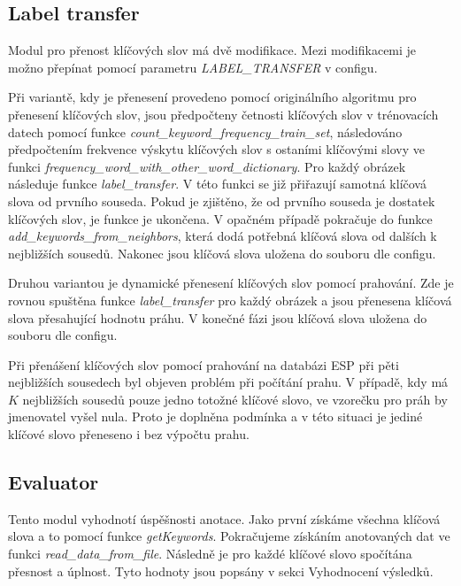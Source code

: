 \documentclass[czech,BP]{thesiskiv}
\begin{document}
\subsection{Label transfer}
\par Modul pro přenost klíčových slov má dvě modifikace. Mezi modifikacemi je možno přepínat pomocí parametru \textit{LABEL\_TRANSFER} v configu. 

\par Při variantě, kdy je přenesení provedeno pomocí originálního algoritmu pro přenesení klíčových slov, jsou předpočteny četnosti klíčových slov v trénovacích datech pomocí funkce \textit{count\_keyword\_frequency\_train\_set}, následováno předpočtením frekvence výskytu klíčových slov s ostaními klíčovými slovy ve funkci \textit{frequency\_word\_with\_other\_word\_dictionary}. Pro každý obrázek následuje funkce \textit{label\_transfer}. V této funkci se již přiřazují samotná klíčová slova od prvního souseda. Pokud je zjištěno, že od prvního souseda je dostatek klíčových slov, je funkce je ukončena. V opačném případě pokračuje do funkce \textit{add\_keywords\_from\_neighbors}, která dodá potřebná klíčová slova od dalších k nejbližších sousedů. Nakonec jsou klíčová slova uložena do souboru dle configu.

\par Druhou variantou je dynamické přenesení klíčových slov pomocí prahování. Zde je rovnou spuštěna funkce \textit{label\_transfer} pro každý obrázek a jsou přenesena klíčová slova přesahující hodnotu práhu. V konečné fázi jsou klíčová slova uložena do souboru dle configu. 

\par Při přenášení klíčových slov pomocí prahování na databázi ESP při pěti nejbližších sousedech byl objeven problém při počítání prahu. V případě, kdy má $K$ nejbližších sousedů pouze jedno totožné klíčové slovo, ve vzorečku pro práh by jmenovatel vyšel nula. Proto je doplněna podmínka a v této situaci je jediné klíčové slovo přeneseno i bez výpočtu prahu. 
  

\subsection{Evaluator}
\par Tento modul vyhodnotí úspěšnosti anotace. Jako první získáme všechna klíčová slova a to pomocí funkce \textit{getKeywords}. Pokračujeme získáním anotovaných dat ve funkci \textit{read\_data\_from\_file}.  Následně je pro každé klíčové slovo spočítána přesnost a úplnost. Tyto hodnoty jsou popsány v sekci Vyhodnocení výsledků.
\end{document}
